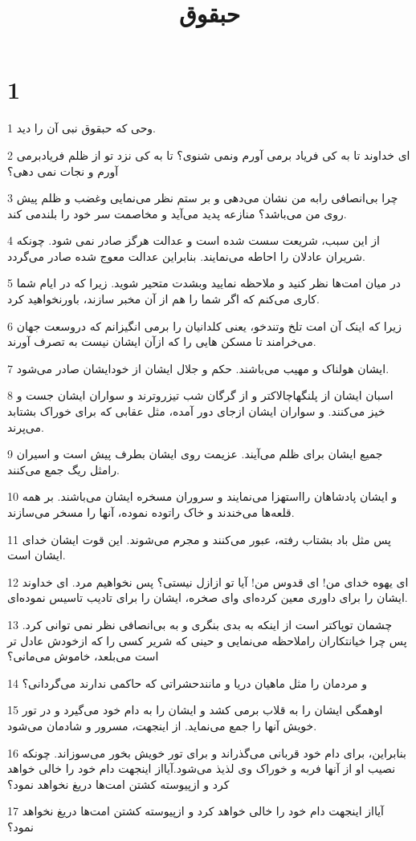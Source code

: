 

\title{حبقوق}


\chapter{1}

\par 1 وحی که حبقوق نبی آن را دید.
\par 2 ‌ای خداوند تا به کی فریاد برمی آورم ونمی شنوی؟ تا به کی نزد تو از ظلم فریادبرمی آورم و نجات نمی دهی؟
\par 3 چرا بی‌انصافی رابه من نشان می‌دهی و بر ستم نظر می‌نمایی وغضب و ظلم پیش روی من می‌باشد؟ منازعه پدید می‌آید و مخاصمت سر خود را بلندمی کند.
\par 4 از این سبب، شریعت سست شده است و عدالت هرگز صادر نمی شود. چونکه شریران عادلان را احاطه می‌نمایند. بنابراین عدالت معوج شده صادر می‌گردد.
\par 5 در میان امت‌ها نظر کنید و ملاحظه نمایید وبشدت متحیر شوید. زیرا که در ایام شما کاری می‌کنم که اگر شما را هم از آن مخبر سازند، باورنخواهید کرد.
\par 6 زیرا که اینک آن امت تلخ وتندخو، یعنی کلدانیان را برمی انگیزانم که دروسعت جهان می‌خرامند تا مسکن هایی را که ازآن ایشان نیست به تصرف آورند.
\par 7 ایشان هولناک و مهیب می‌باشند. حکم و جلال ایشان از خودایشان صادر می‌شود.
\par 8 اسبان ایشان از پلنگهاچالاکتر و از گرگان شب تیزروترند و سواران ایشان جست و خیز می‌کنند. و سواران ایشان ازجای دور آمده، مثل عقابی که برای خوراک بشتابد می‌پرند.
\par 9 جمیع ایشان برای ظلم می‌آیند. عزیمت روی ایشان بطرف پیش است و اسیران رامثل ریگ جمع می‌کنند.
\par 10 و ایشان پادشاهان رااستهزا می‌نمایند و سروران مسخره ایشان می‌باشند. بر همه قلعه‌ها می‌خندند و خاک راتوده نموده، آنها را مسخر می‌سازند.
\par 11 پس مثل باد بشتاب رفته، عبور می‌کنند و مجرم می‌شوند. این قوت ایشان خدای ایشان است.
\par 12 ‌ای یهوه خدای من! ای قدوس من! آیا تو ازازل نیستی؟ پس نخواهیم مرد. ای خداوند ایشان را برای داوری معین کرده‌ای و‌ای صخره، ایشان را برای تادیب تاسیس نموده‌ای.
\par 13 چشمان توپاکتر است از اینکه به بدی بنگری و به بی‌انصافی نظر نمی توانی کرد. پس چرا خیانتکاران راملاحظه می‌نمایی و حینی که شریر کسی را که ازخودش عادل تر است می‌بلعد، خاموش می‌مانی؟
\par 14 و مردمان را مثل ماهیان دریا و مانندحشراتی که حاکمی ندارند می‌گردانی؟
\par 15 اوهمگی ایشان را به قلاب برمی کشد و ایشان را به دام خود می‌گیرد و در تور خویش آنها را جمع می‌نماید. از اینجهت، مسرور و شادمان می‌شود.
\par 16 بنابراین، برای دام خود قربانی می‌گذراند و برای تور خویش بخور می‌سوزاند. چونکه نصیب او از آنها فربه و خوراک وی لذیذ می‌شود.آیااز اینجهت دام خود را خالی خواهد کرد و ازپیوسته کشتن امت‌ها دریغ نخواهد نمود؟
\par 17 آیااز اینجهت دام خود را خالی خواهد کرد و ازپیوسته کشتن امت‌ها دریغ نخواهد نمود؟

